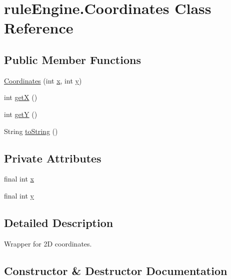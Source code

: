 \hypertarget{classrule_engine_1_1_coordinates}{}\section{rule\+Engine.\+Coordinates Class Reference}
\label{classrule_engine_1_1_coordinates}
\subsection*{Public Member Functions}
\begin{DoxyCompactItemize}
\item 
\mbox{\hyperlink{classrule_engine_1_1_coordinates_a1c44fddef61c8da723b42582f02b3fbe}{Coordinates}} (int \mbox{\hyperlink{classrule_engine_1_1_coordinates_a31056382eacd17603456770dff83250a}{x}}, int \mbox{\hyperlink{classrule_engine_1_1_coordinates_a24ee9a3c2ea5d1d892f8d0955d4cf60f}{y}})
\item 
int \mbox{\hyperlink{classrule_engine_1_1_coordinates_a2b3c0539db7bec01491eef738487b147}{getX}} ()
\item 
int \mbox{\hyperlink{classrule_engine_1_1_coordinates_ad14bb7f6ecd9607d8f0110a38c6b3e87}{getY}} ()
\item 
String \mbox{\hyperlink{classrule_engine_1_1_coordinates_afb096dd5f3830a32c84b12be4b49fcb7}{to\+String}} ()
\end{DoxyCompactItemize}
\subsection*{Private Attributes}
\begin{DoxyCompactItemize}
\item 
final int \mbox{\hyperlink{classrule_engine_1_1_coordinates_a31056382eacd17603456770dff83250a}{x}}
\item 
final int \mbox{\hyperlink{classrule_engine_1_1_coordinates_a24ee9a3c2ea5d1d892f8d0955d4cf60f}{y}}
\end{DoxyCompactItemize}


\subsection{Detailed Description}
Wrapper for 2D coordinates. 

\subsection{Constructor \& Destructor Documentation}
\mbox{\label{classrule_engine_1_1_coordinates_a1c44fddef61c8da723b42582f02b3fbe}} 

